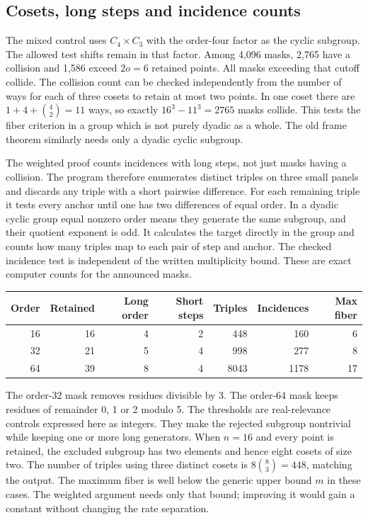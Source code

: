 \documentclass[12pt,letterpaper]{article}
\begin{document}
\subsection{Cosets, long steps and incidence counts}

The mixed control uses \(C_4\times C_3\) with the order-four factor as the cyclic subgroup. The allowed test shifts remain in that factor. Among 4,096 masks, 2,765 have a collision and 1,586 exceed \(2o=6\) retained points. All masks exceeding that cutoff collide. The collision count can be checked independently from the number of ways for each of three cosets to retain at most two points. In one coset there are \(1+4+\binom42=11\) ways, so exactly \(16^3-11^3=2765\) masks collide. This tests the fiber criterion in a group which is not purely dyadic as a whole. The old frame theorem similarly needs only a dyadic cyclic subgroup.

The weighted proof counts incidences with long steps, not just masks having a collision. The program therefore enumerates distinct triples on three small panels and discards any triple with a short pairwise difference. For each remaining triple it tests every anchor until one has two differences of equal order. In a dyadic cyclic group equal nonzero order means they generate the same subgroup, and their quotient exponent is odd. It calculates the target directly in the group and counts how many triples map to each pair of step and anchor. The checked incidence test is independent of the written multiplicity bound. These are exact computer counts for the announced masks.
\begin{center}
\begin{tabular}{@{}rrrrrrr@{}}
\toprule
Order & Retained & Long order & Short steps & Triples & Incidences & Max fiber\\
\midrule
16&16&4&2&448&160&6\\
32&21&5&4&998&277&8\\
64&39&8&4&8043&1178&17\\
\bottomrule
\end{tabular}
\end{center}
The order-32 mask removes residues divisible by 3. The order-64 mask keeps residues of remainder 0, 1 or 2 modulo 5. The thresholds are real-relevance controls expressed here as integers. They make the rejected subgroup nontrivial while keeping one or more long generators. When \(n=16\) and every point is retained, the excluded subgroup has two elements and hence eight cosets of size two. The number of triples using three distinct cosets is \(8\binom83=448\), matching the output. The maximum fiber is well below the generic upper bound \(m\) in these cases. The weighted argument needs only that bound; improving it would gain a constant without changing the rate separation.
\end{document}

